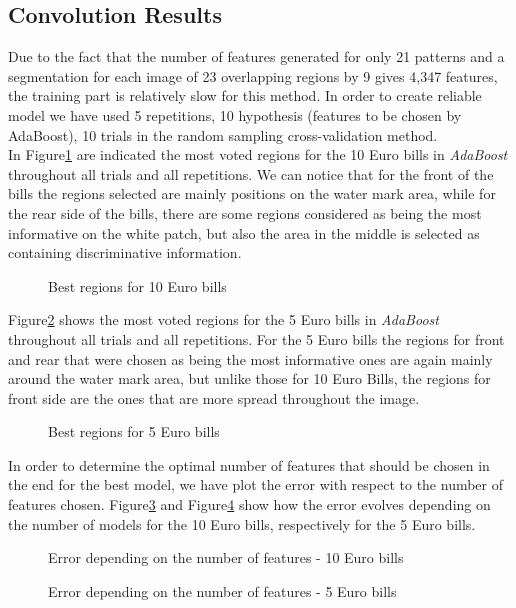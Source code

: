 \documentclass[11pt,twocolumn]{article}
\begin{document}
	\subsection{Convolution Results}\label{sec:haar_results}
	\hspace*{10px}Due to the fact that the number of features generated for only 21 patterns and a segmentation for each image of 23 overlapping regions by 9 gives 4,347 features, the training part is relatively slow for this method. In order to create reliable model we have used 5 repetitions, 10 hypothesis (features to be chosen by AdaBoost), 10 trials in the random sampling cross-validation method.\\
	\hspace*{10px}In Figure\ref{haar_regions10} are indicated the most voted regions for the 10 Euro bills in \emph{AdaBoost} throughout all trials and all repetitions. We can notice that for the front of the bills the regions selected are mainly positions on the water mark area, while for the rear side of the bills, there are some regions considered as being the most informative on the white patch, but also the area in the middle is selected as containing discriminative information.\\  
\begin{figure}[!hbtp]
\centering
{}
\caption{Best regions for 10 Euro bills}
\label{haar_regions10}
\end{figure}
	\hspace*{10px}Figure\ref{haar_regions5} shows the most voted regions for the 5 Euro bills in \emph{AdaBoost} throughout all trials and all repetitions. For the 5 Euro bills the regions for front and rear that were chosen as being the most informative ones are again mainly around the water mark area, but unlike those for 10 Euro Bills, the regions for front side are the ones that are more spread throughout the image.\\  
\begin{figure}[!hbtp]
\centering
{}
\caption{Best regions for 5 Euro bills}
\label{haar_regions5}
\end{figure} 
	\hspace*{10px}In order to determine the optimal number of features that should be chosen in the end for the best model, we have plot the error with respect to the number of features chosen. Figure\ref{haar_plot10} and Figure\ref{haar_plot5} show how the error evolves depending on the number of models for the 10 Euro bills, respectively for the 5 Euro bills.
\begin{figure}[!hbtp]
\centering
{}
\caption{Error depending on the number of features - 10 Euro bills}
\label{haar_plot10}
\end{figure} 
\begin{figure}[!hbtp]
\centering
{}
\caption{Error depending on the number of features - 5 Euro bills}
\label{haar_plot5}
\end{figure} 
\end{document}
